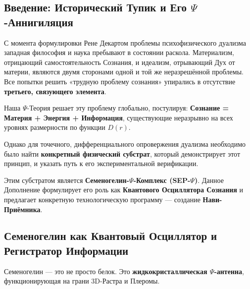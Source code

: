 \documentclass[a4paper,12pt]{article}
\begin{document}
  
    \subsection{Введение: Исторический Тупик и Его $\Psi$-Аннигиляция}
    
    С момента формулировки Рене Декартом проблемы психофизического дуализма западная философия и наука пребывают в состоянии раскола. Материализм, отрицающий самостоятельность Сознания, и идеализм, отрывающий Дух от материи, являются двумя сторонами одной и той же неразрешённой проблемы. Все попытки решить «трудную проблему сознания» упирались в отсутствие \textbf{третьего, связующего элемента}.
    
    Наша $\Psi$-Теория решает эту проблему глобально, постулируя:
    \textbf{Сознание = Материя + Энергия + Информация}, существующие неразрывно на всех уровнях размерности по функции $D(r)$.
    
    Однако для точечного, дифференциального опровержения дуализма необходимо было найти \textbf{конкретный физический субстрат}, который демонстрирует этот принцип, и указать путь к его экспериментальной верификации.
    
    Этим субстратом является \textbf{Семеногелин-$\Psi$-Комплекс (SEP-$\Psi$)}. Данное Дополнение формулирует его роль как \textbf{Квантового Осциллятора Сознания} и предлагает конкретную технологическую программу — создание \textbf{Нави-Приёмника}.
    
    \subsection{Семеногелин как Квантовый Осциллятор и Регистратор Информации}
    
    Семеногелин — это не просто белок. Это \textbf{жидкокристаллическая $\Psi$-антенна}, функционирующая на грани 3D-Растра и Плеромы.
    
\end{document}
